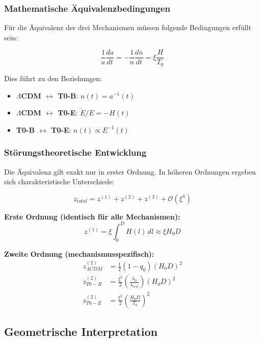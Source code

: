\documentclass[12pt,a4paper]{article}
\theoremstyle{definition}
\begin{document}
\subsubsection{Mathematische Äquivalenzbedingungen}

Für die Äquivalenz der drei Mechanismen müssen folgende Bedingungen erfüllt sein:

\begin{equation}
	\boxed{\frac{1}{a}\frac{da}{dt} = -\frac{1}{n}\frac{dn}{dt} = \xi \frac{H}{T_0}}
\end{equation}

Dies führt zu den Beziehungen:
\begin{itemize}
	\item \textbf{\(\Lambda\)CDM \(\leftrightarrow\) T0-B}: \(n(t) = a^{-1}(t)\)
	\item \textbf{\(\Lambda\)CDM \(\leftrightarrow\) T0-E}: \(\dot{E}/E = -H(t)\)
	\item \textbf{T0-B \(\leftrightarrow\) T0-E}: \(n(t) \propto E^{-1}(t)\)
\end{itemize}

\subsubsection{Störungstheoretische Entwicklung}

Die Äquivalenz gilt exakt nur in erster Ordnung. In höheren Ordnungen ergeben sich charakteristische Unterschiede:

\begin{equation}
	z_{total} = z^{(1)} + z^{(2)} + z^{(3)} + \mathcal{O}(\xi^4)
\end{equation}

\textbf{Erste Ordnung (identisch für alle Mechanismen):}
\begin{equation}
	z^{(1)} = \xi \int_0^D H(l) \, dl \approx \xi H_0 D
\end{equation}

\textbf{Zweite Ordnung (mechanismusspezifisch):}
\begin{align}
	z^{(2)}_{\Lambda CDM} &= \frac{1}{2}(1-q_0)(H_0 D)^2 \\
	z^{(2)}_{T0-B} &= \frac{\xi^2}{2}\left(\frac{\lambda_0}{\lambda_{crit}}\right)(H_0 D)^2 \\
	z^{(2)}_{T0-E} &= \frac{\xi^2}{2}\left(\frac{H_0 D}{T_0}\right)^2
\end{align}

\subsection{Geometrische Interpretation}
\label{subsec:geometric}
\end{document}
